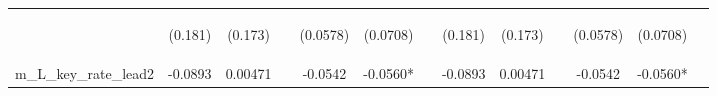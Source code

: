 \documentclass[]{article}
\begin{document}
\begin{center}
\begin{tabular}{lcccccccccccc}
\vspace{4pt} & \begin{footnotesize}(0.181)\end{footnotesize} & \begin{footnotesize}(0.173)\end{footnotesize} & \begin{footnotesize}\end{footnotesize} & \begin{footnotesize}(0.0578)\end{footnotesize} & \begin{footnotesize}(0.0708)\end{footnotesize} & \begin{footnotesize}\end{footnotesize} & \begin{footnotesize}(0.181)\end{footnotesize} & \begin{footnotesize}(0.173)\end{footnotesize} & \begin{footnotesize}\end{footnotesize} & \begin{footnotesize}(0.0578)\end{footnotesize} & \begin{footnotesize}(0.0708)\end{footnotesize} & \begin{footnotesize}\end{footnotesize} \\
m\_L\_key\_rate\_lead2 & -0.0893 & 0.00471 &  & -0.0542 & -0.0560* &  & -0.0893 & 0.00471 &  & -0.0542 & -0.0560* &  \\

\end{tabular}
\end{center}
\end{document}
